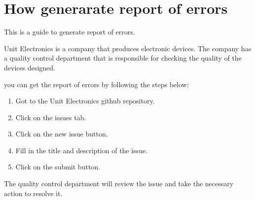 \documentclass[letterpaper,10pt,english]{sphinxmanual}
\begin{document}
\sphinxstepscope


\chapter{How generarate report of errors}
\label{\detokenize{report:how-generarate-report-of-errors}}\label{\detokenize{report::doc}}
\sphinxAtStartPar
This is a guide to generate report of errors.

\sphinxAtStartPar
Unit Electronics is a company that produces electronic devices. The company has a quality control
department that is responsible for checking the quality of the devices designed.

\sphinxAtStartPar
you can get the report of errors by following the steps below:
\begin{enumerate}
%
\item {} 
\sphinxAtStartPar
Got to the Unit Electronics github repository.

\item {} 
\sphinxAtStartPar
Click on the issues tab.

\item {} 
\sphinxAtStartPar
Click on the new issue button.

\item {} 
\sphinxAtStartPar
Fill in the title and description of the issue.

\item {} 
\sphinxAtStartPar
Click on the submit button.

\end{enumerate}

\sphinxAtStartPar
The quality control department will review the issue and take the necessary action to resolve it.



\renewcommand{\indexname}{Index}
\printindex
\end{document}
